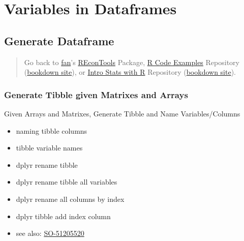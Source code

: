\documentclass[
]{book}
\providecommand{\tightlist}{%
  \setlength{\itemsep}{0pt}\setlength{\parskip}{0pt}}
\begin{document}
\hypertarget{variables-in-dataframes}{%
\section{Variables in Dataframes}\label{variables-in-dataframes}}

\hypertarget{generate-dataframe}{%
\subsection{Generate Dataframe}\label{generate-dataframe}}

\begin{quote}
Go back to \href{http://fanwangecon.github.io/}{fan}'s \href{https://fanwangecon.github.io/REconTools/}{REconTools} Package, \href{https://fanwangecon.github.io/R4Econ/}{R Code Examples} Repository (\href{https://fanwangecon.github.io/R4Econ/bookdown}{bookdown site}), or \href{https://fanwangecon.github.io/Stat4Econ/}{Intro Stats with R} Repository (\href{https://fanwangecon.github.io/Stat4Econ/bookdown}{bookdown site}).
\end{quote}

\hypertarget{generate-tibble-given-matrixes-and-arrays}{%
\subsubsection{Generate Tibble given Matrixes and Arrays}\label{generate-tibble-given-matrixes-and-arrays}}

Given Arrays and Matrixes, Generate Tibble and Name Variables/Columns

\begin{itemize}
\tightlist
\item
  naming tibble columns
\item
  tibble variable names
\item
  dplyr rename tibble
\item
  dplyr rename tibble all variables
\item
  dplyr rename all columns by index
\item
  dplyr tibble add index column
\item
  see also: \href{https://stackoverflow.com/questions/45535157/difference-between-dplyrrename-and-dplyrrename-all}{SO-51205520}
\end{itemize}
\end{document}
